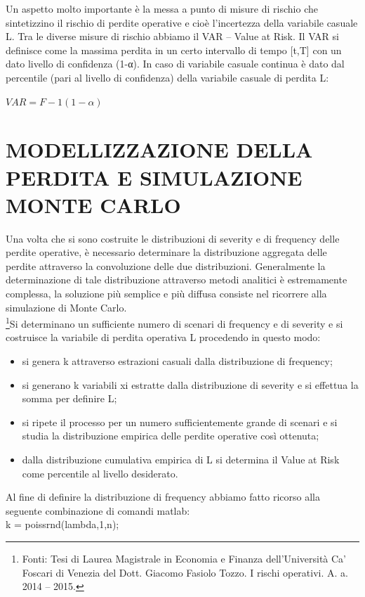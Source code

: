 \documentclass[titlepage]{article}
\begin{document}
\begin{itemize}
 Un aspetto molto importante è la messa a punto di misure di rischio che sintetizzino il rischio di perdite operative e cioè l’incertezza della variabile casuale L. Tra le diverse misure di rischio abbiamo il VAR – Value at Risk. Il VAR si definisce come la massima perdita in un certo intervallo di tempo [t,T] con un dato livello di confidenza (1-α). In caso di variabile casuale continua è dato dal percentile (pari al livello di confidenza) della variabile casuale di perdita L:\\{$VAR=F-1(1-\alpha)
$


\section{MODELLIZZAZIONE DELLA PERDITA E SIMULAZIONE MONTE CARLO}
Una volta che si sono costruite le distribuzioni di severity e di frequency delle perdite operative, è necessario determinare la distribuzione aggregata delle perdite attraverso la convoluzione delle due distribuzioni. Generalmente la determinazione di tale distribuzione attraverso metodi analitici è estremamente complessa, la soluzione più semplice e più diffusa consiste nel ricorrere alla simulazione di Monte Carlo.
\\
\footnote{Fonti: Tesi di Laurea Magistrale in Economia e Finanza dell’Università Ca’ Foscari di Venezia del Dott. Giacomo Fasiolo Tozzo. I rischi operativi. A. a. 2014 – 2015.}Si determinano un sufficiente numero di scenari di frequency e di severity e si costruisce la variabile di perdita operativa L procedendo in questo modo:

\begin{itemize}
\item si genera k attraverso estrazioni casuali dalla distribuzione di frequency;
\item	si generano k variabili xi estratte dalla distribuzione di severity e si effettua la somma per definire L;
\item	si ripete il processo per un numero sufficientemente grande di scenari e si studia la distribuzione empirica delle perdite operative così ottenuta;
\item	dalla distribuzione cumulativa empirica di L si determina il Value at Risk come percentile al livello desiderato.
\end{itemize}
Al fine di definire la distribuzione di frequency abbiamo fatto ricorso alla seguente combinazione di comandi matlab:\\
k = poissrnd(lambda,1,n);
\\

}
\end{itemize}
\end{document}
